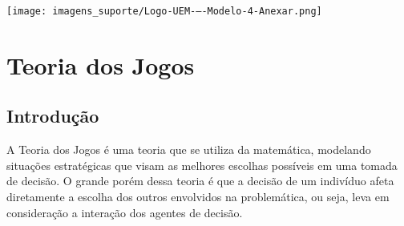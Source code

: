 \documentclass[
	12pt,				%
	openright,			%
	oneside,			%
	a4paper,			%
	english,			%
	french,				%
	spanish,			%
	brazil				%
	]{abntex2}
\begin{document}
\begin{minipage}[c][1cm][c]{1cm} %

\centering

\texttt{[image: imagens\_suporte/Logo-UEM-–-Modelo-4-Anexar.png]}  

\end{minipage}


\frenchspacing 


\imprimircapa


\setlength{\absparsep}{18pt} %



\tableofcontents*
\cleardoublepage



\textual

\part{Teoria dos Jogos}


\chapter[Introdução]{Introdução}


A Teoria dos Jogos é uma teoria que se utiliza da matemática, modelando situações estratégicas que visam as melhores escolhas possíveis em uma tomada de decisão. O grande porém dessa teoria é que a decisão de um indivíduo afeta diretamente a escolha dos outros envolvidos na problemática, ou seja, leva em consideração a interação dos agentes de decisão.
\end{document}
